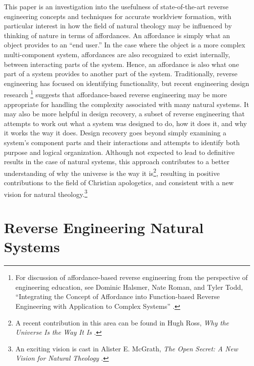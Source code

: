 This paper is an investigation into the usefulness of state-of-the-art
reverse engineering concepts and techniques for accurate worldview
formation, with particular interest in how the field of natural
theology may be influenced by thinking of nature in terms of
affordances. An affordance is simply what an object provides to an ``end
user.'' In the case where the object is a more complex multi-component
system, affordances are also recognized to exist internally, between
interacting parts of the system. Hence, an affordance is also what one
part of a system provides to another part of the system. Traditionally,
reverse engineering has focused on identifying functionality, but
recent engineering design research \citep[][pp. 34--37]{maier2008}\footnote{
For
discussion of affordance-based reverse engineering from the perspective
of engineering education, see Dominic Halsmer, Nate Roman, and Tyler
Todd, “Integrating the Concept of Affordance into Function-based
Reverse Engineering with Application to Complex Systems” .
} suggests that
affordance-based reverse engineering may be more appropriate for
handling the complexity associated with many natural systems. It may
also be more helpful in design recovery, a subset of reverse
engineering that attempts to work out what a system was designed to do,
how it does it, and why it works the way it does.  Design recovery goes beyond simply
examining a system's component parts and their interactions and attempts to identify 
both purpose and logical organization. Although not
expected to lead to definitive results in the case of natural systems,
this approach contributes to a better understanding of why the universe
is the way it is\footnote{
A recent contribution in this area can be found in
Hugh Ross, \textit{Why the Universe Is the Way It Is} \citep{ross2008}.
}, resulting in positive
contributions to the field of Christian apologetics, and consistent
with a new vision for natural theology.\footnote{
An exciting vision is cast in Alister E. McGrath,
\textit{The Open Secret: A New Vision for Natural Theology} \citep{mcgrath2008}.
}

\section{Reverse Engineering Natural Systems}

